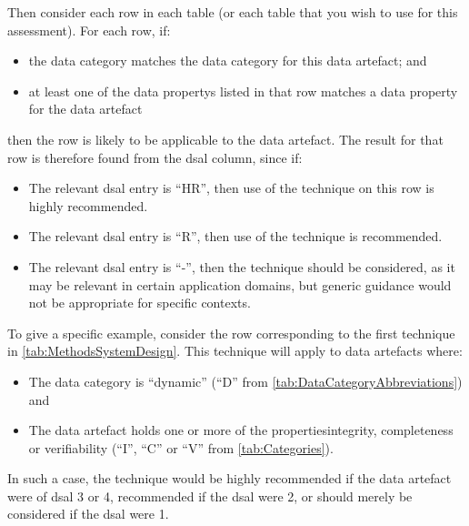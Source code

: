 Then consider each row in each table (or each table that you wish to use for this assessment). For each row, if:
\begin{itemize}
    \item the data category matches the data category for this \gls{data artefact}; and
    \item at least one of the \glspl{data property} listed in that row matches a \gls{data property} for the \gls{data artefact} 
\end{itemize}
then the row is likely to be applicable to the \gls{data artefact}. The result for that row is therefore found from the \gls{dsal} column, since if:
\begin{itemize}
    \item The relevant \gls{dsal} entry is ``HR'', then use of the technique on this row is highly recommended.
    \item The relevant \gls{dsal} entry is ``R'', then use of the technique is recommended.
    \item The relevant \gls{dsal} entry is ``-'', then the technique should be considered, as it may be relevant in certain application domains, but  generic guidance would not be appropriate for specific contexts.
\end{itemize}

To give a specific example, consider the row corresponding to the first technique in \autoref{tab:MethodsSystemDesign}. This technique will apply to \glspl{data artefact} where:
\begin{itemize}
    \item The data category is ``dynamic'' (``D'' from \autoref{tab:DataCategoryAbbreviations}) and
    \item The \gls{data artefact} holds one or more of the properties\gls{integrity}, \gls{completeness} or \gls{verifiability} (``I'', ``C'' or ``V'' from \autoref{tab:Categories}).
\end{itemize}
In such a case, the technique would be highly recommended if the \gls{data artefact} were of \gls{dsal} 3 or 4, recommended if the \gls{dsal} were 2, or should merely be considered if the \gls{dsal} were 1.

